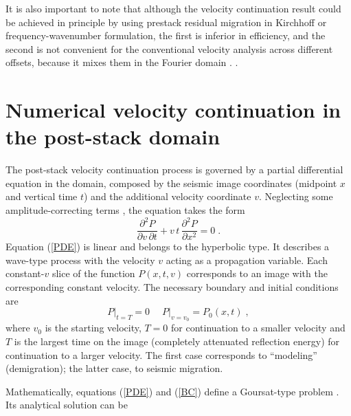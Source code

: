 It is also important to note that although the velocity continuation result
could be achieved in principle by using prestack residual migration in
Kirchhoff \cite[]{Etgen.sepphd.68} or frequency-wavenumber
\cite[]{GEO61-02-06050607} formulation, the first is inferior in efficiency, and
the second is not convenient for the conventional velocity analysis across
different offsets, because it mixes them in the Fourier domain
\cite[]{SEG-2000-09920995}.  
\cite[]{SEG-2001-02960299,sandf}  \cite{adler}.

\section{Numerical velocity continuation in the post-stack domain}
\par
The post-stack velocity continuation process is governed by a partial
differential equation in the domain, composed by the seismic image
coordinates (midpoint $x$ and vertical time $t$) and the additional
velocity coordinate $v$. Neglecting some amplitude-correcting terms
\cite[]{first}, the equation takes the form
\cite[]{Claerbout.sep.48.79}
\begin{equation}
  {\frac{\partial^2 P}{\partial v\, \partial t}} +
  {v\,t\,\frac{\partial^2 P}{\partial x^2}} = 0\;.
\label{PDE}
\end{equation}
Equation (\ref{PDE}) is linear and belongs to the hyperbolic type. It
describes a wave-type process with the velocity $v$ acting as a
propagation variable. Each constant-$v$ slice of the function
$P(x,t,v)$ corresponds to an image with the corresponding constant
velocity. The necessary boundary and initial conditions are 
\begin{equation}
  \label{BC}
  \left.P\right|_{t=T} = 0\;\quad \left.P\right|_{v=v_0} = P_0 (x,t)\;,
\end{equation}
where $v_0$ is the starting velocity, $T=0$ for continuation to a smaller
velocity and $T$ is the largest time on the image (completely attenuated
reflection energy) for continuation to a larger velocity.  The first case
corresponds to ``modeling'' (demigration); the latter case, to seismic
migration.
\par
Mathematically, equations (\ref{PDE}) and (\ref{BC}) define a
Goursat-type problem \cite[]{kurant2}. Its analytical solution can be
